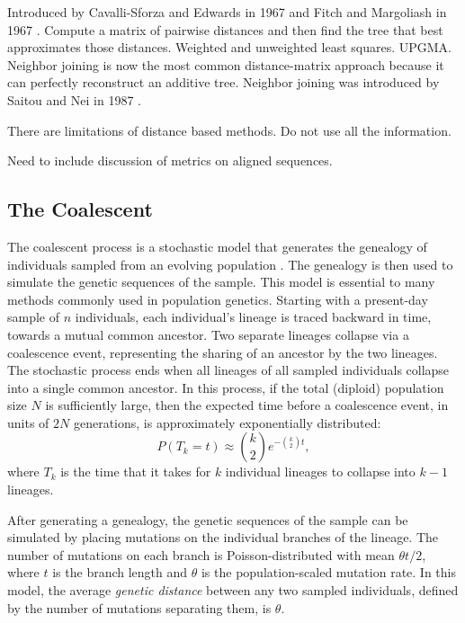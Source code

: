 Introduced by Cavalli-Sforza and Edwards in 1967 \cite{CavalliSforza:1967th} and Fitch and Margoliash in 1967 \cite{Fitch:1967we}.
Compute a matrix of pairwise distances and then find the tree that best approximates those distances.
Weighted and unweighted least squares.
UPGMA.
Neighbor joining is now the most common distance-matrix approach because it can perfectly reconstruct an additive tree.
Neighbor joining was introduced by Saitou and Nei in 1987 \cite{Saitou:1987wo}.

There are limitations of distance based methods.
Do not use all the information.

Need to include discussion of metrics on aligned sequences.

\subsection{The Coalescent}

The coalescent process is a stochastic model that generates the genealogy of individuals sampled from an evolving population \cite{Wakeley:2009}.
The genealogy is then used to simulate the genetic sequences of the sample.
This model is essential to many methods commonly used in population genetics.
Starting with a present-day sample of $n$ individuals, each individual's lineage is traced backward in time, towards a mutual common ancestor.
Two separate lineages collapse via a coalescence event, representing the sharing of an ancestor by the two lineages.
The stochastic process ends when all lineages of all sampled individuals collapse into a single common ancestor.
In this process, if the total (diploid) population size $N$ is sufficiently large, then the expected time before a coalescence event, in units of $2N$ generations, is approximately exponentially distributed:
\begin{equation}
P(T_{k}=t) \approx \binom{k}{2} e ^{-\binom{k}{2} t},
\end{equation}
where $T_k$ is the time that it takes for $k$ individual lineages to collapse into $k-1$ lineages.

After generating a genealogy, the genetic sequences of the sample can be simulated by placing mutations on the individual branches of the lineage.
The number of mutations on each branch is Poisson-distributed with mean $\theta t / 2$, where $t$ is the branch length and $\theta$ is the population-scaled mutation rate.
In this model, the average \emph{genetic distance} between any two sampled individuals, defined by the number of mutations separating them, is $\theta$.

